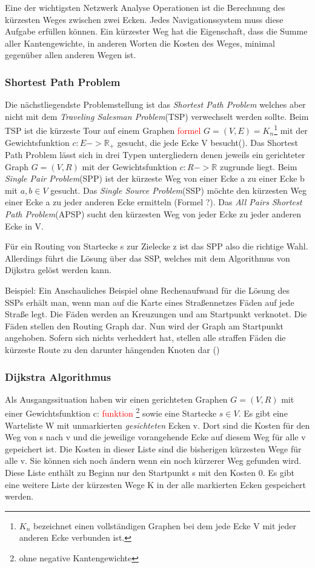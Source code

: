 \documentclass[10pt,a4paper]{article}
\newcommand\todo[1]{\textcolor{red}{#1}}
\begin{document}
Eine der wichtigsten Netzwerk Analyse Operationen ist die Berechnung des kürzesten Weges zwischen zwei Ecken. Jedes Navigationssystem muss diese Aufgabe erfüllen können. Ein kürzester Weg hat die Eigenschaft, dass die Summe aller Kantengewichte, in anderen Worten die Kosten des Weges, minimal gegenüber allen anderen Wegen ist.

\subsubsection{Shortest Path Problem}
Die nächstliegendste Problemstellung ist das \textit{Shortest Path Problem} welches aber nicht mit dem \textit{Traveling Salesman Problem}(TSP) verwechselt werden sollte. Beim TSP ist die kürzeste Tour auf einem Graphen \todo{formel} $G  = (V,E) = K_{n}$\footnote{$K_{n}$ bezeichnet einen vollständigen Graphen bei dem jede Ecke V mit jeder anderen Ecke verbunden ist.} mit der Gewichtsfunktion $c: E -> \mathbb{R}_{+}$ gesucht, die jede Ecke V besucht(\cite[135]{algorithms}).
Das Shortest Path Problem lässt sich in drei Typen untergliedern denen jeweils ein gerichteter Graph $G = (V,R)$ mit der Gewichtsfunktion $c: R -> \mathbb{R}$ zugrunde liegt. Beim \textit{Single Pair Problem}(SPP) ist der kürzeste Weg von einer Ecke a zu einer Ecke b mit $a,b\in V$ gesucht. Das \textit{Single Source Problem}(SSP) möchte den kürzesten Weg einer Ecke a zu jeder anderen Ecke ermitteln (Formel ?). Das \textit{All Pairs Shortest Path Problem}(APSP) sucht den kürzesten Weg von jeder Ecke zu jeder anderen Ecke in V. \cite[169f]{algorithms}

Für ein Routing von Startecke s zur Zielecke z ist das SPP also die richtige Wahl. Allerdings führt die Lösung über das SSP, welches mit dem Algorithmus von Dijkstra gelöst werden kann.

Beispiel:
Ein Anschauliches Beispiel ohne Rechenaufwand für die Lösung des SSPs erhält man, wenn man auf die Karte eines Straßennetzes Fäden auf jede Straße legt. Die Fäden werden an Kreuzungen und am Startpunkt verknotet. Die Fäden stellen den Routing Graph dar. Nun wird der Graph am Startpunkt angehoben. Sofern sich nichts verheddert hat, stellen alle straffen Fäden die kürzeste Route zu den darunter hängenden Knoten dar (\cite[191]{kurt})


\subsubsection{Dijkstra Algorithmus}

Als Ausgangssituation haben wir einen gerichteten Graphen $G = (V,R)$ mit einer Gewichtsfunktion c: \todo{funktion} \footnote{ohne negative Kantengewichte} sowie eine Startecke $s \in V$. Es gibt eine Warteliste W mit unmarkierten \textit{gesichteten} Ecken v. Dort sind die Kosten für den Weg von s nach v und die jeweilige vorangehende Ecke auf diesem Weg für alle v gepeichert ist. Die Kosten in dieser Liste sind die bisherigen kürzesten Wege für alle v. Sie können sich noch ändern wenn ein noch kürzerer Weg gefunden wird. Diese Liste enthält zu Beginn nur den Startpunkt s mit den Kosten 0. Es gibt eine weitere Liste der kürzesten Wege K in der alle markierten Ecken gespeichert werden.
\end{document}
